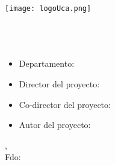 \begin{titlepage}
\begin{center}

\texttt{[image: logoUca.png]} \\
\vspace{2.0cm}
\LARGE{\textbf{\MakeUppercase{\mySchoolName}}} \\
\vspace{1.0cm}
\Large{\textbf{\MakeUppercase{\myCareerName}}} \\
\vspace{2.0cm}
\Large{\myProjectName} \\
\vspace{1.0cm}
\end{center}

\begin{itemize}
\item \large{Departamento: \myDepartmentName}
\item \large{Director del proyecto: {\myTutorName}}
\if \myCotutorName\empty
\else
    \item \large{Co-director del proyecto: {\myCotutorName}}
\fi
\item \large{Autor del proyecto: \myAuthorName}
\end{itemize}

\vspace{1.0cm}

\begin{flushright}
  \large{\myAuthorCity, \myProjectDate} \\
  \vspace{0.5cm}
  \large{Fdo: \myAuthorName}
\end{flushright}
\end{titlepage}